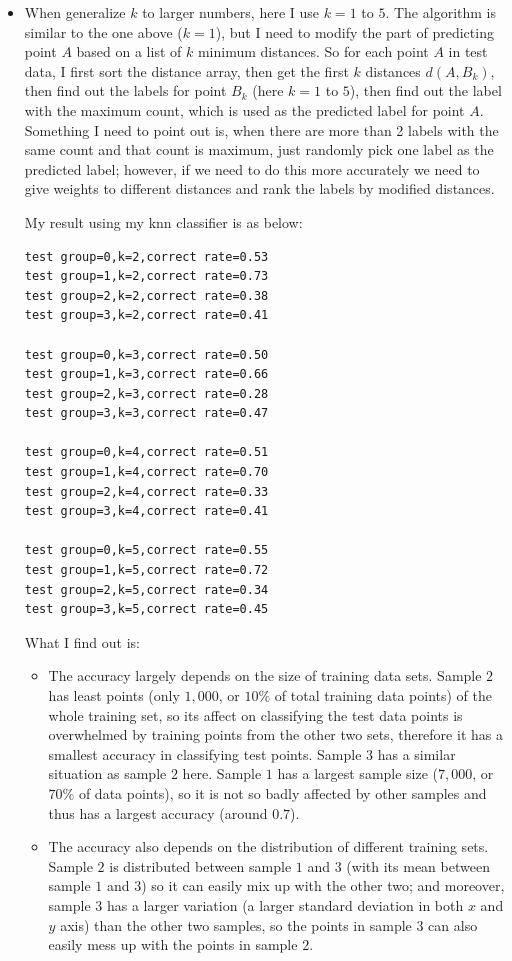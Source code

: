 \begin{itemize}
\item When generalize $k$ to larger numbers, here I use $k=1$ to $5$. The algorithm is similar to the one above ($k=1$), but I need to modify the part of predicting point $A$ based on a list of $k$ minimum distances. So for each point $A$ in test data, I first sort the distance array, then get the first $k$ distances $d(A,B_k)$, then find out the labels for point $B_k$ (here $k= 1$ to $5$), then find out the label with the maximum count, which is used as the predicted label for point $A$. Something I need to point out is, when there are more than 2 labels with the same count and that count is maximum, just randomly pick one label as the predicted label; however, if we need to do this more accurately we need to give weights to different distances and rank the labels by modified distances. 

My result using my knn classifier is as below:
\begin{verbatim}
test group=0,k=2,correct rate=0.53
test group=1,k=2,correct rate=0.73
test group=2,k=2,correct rate=0.38
test group=3,k=2,correct rate=0.41
 
test group=0,k=3,correct rate=0.50
test group=1,k=3,correct rate=0.66
test group=2,k=3,correct rate=0.28
test group=3,k=3,correct rate=0.47
 
test group=0,k=4,correct rate=0.51
test group=1,k=4,correct rate=0.70
test group=2,k=4,correct rate=0.33
test group=3,k=4,correct rate=0.41
 
test group=0,k=5,correct rate=0.55
test group=1,k=5,correct rate=0.72
test group=2,k=5,correct rate=0.34
test group=3,k=5,correct rate=0.45
\end{verbatim}

What I find out is:
\begin{itemize}
\item The accuracy largely depends on the size of training data sets. Sample $2$ has least points (only $1,000$, or $10\%$ of total training data points) of the whole training set, so its affect on classifying the test data points is overwhelmed by training points from the other two sets, therefore it has a smallest accuracy in classifying test points. Sample $3$ has a similar situation as sample $2$ here. Sample $1$ has a largest sample size ($7,000$, or $70\%$ of data points), so it is not so badly affected by other samples and thus has a largest accuracy (around $0.7$).  

\item The accuracy also depends on the distribution of different training sets. Sample $2$ is distributed between sample $1$ and $3$ (with its mean between sample $1$ and $3$) so it can easily mix up with the other two; and moreover, sample $3$ has a larger variation (a larger standard deviation in both $x$ and $y$ axis) than the other two samples, so the points in sample $3$ can also easily mess up with the points in sample $2$. 


\end{itemize}
\end{itemize}
